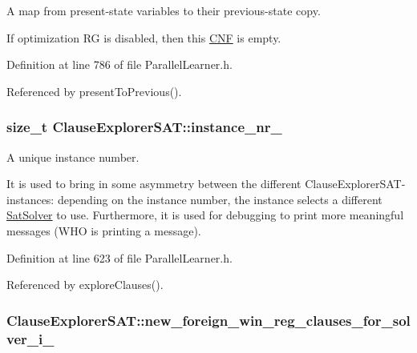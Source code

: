 A map from present-\/state variables to their previous-\/state copy. 

If optimization R\-G is disabled, then this \hyperlink{classCNF}{C\-N\-F} is empty. 

Definition at line 786 of file Parallel\-Learner.\-h.



Referenced by present\-To\-Previous().

\hypertarget{classClauseExplorerSAT_ab9ff4163b38a8ce70e07b78ea2e76cc2}{
\subsubsection[{instance\-\_\-nr\-\_\-}]{\setlength{\rightskip}{0pt plus 5cm}size\-\_\-t Clause\-Explorer\-S\-A\-T\-::instance\-\_\-nr\-\_\-\hspace{0.3cm}{\ttfamily [protected]}}}\label{classClauseExplorerSAT_ab9ff4163b38a8ce70e07b78ea2e76cc2}


A unique instance number. 

It is used to bring in some asymmetry between the different Clause\-Explorer\-S\-A\-T-\/instances\-: depending on the instance number, the instance selects a different \hyperlink{classSatSolver}{Sat\-Solver} to use. Furthermore, it is used for debugging to print more meaningful messages (W\-H\-O is printing a message). 

Definition at line 623 of file Parallel\-Learner.\-h.



Referenced by explore\-Clauses().

\hypertarget{classClauseExplorerSAT_a70c8edd590d75994ee354d591909cd35}{
\subsubsection[{new\-\_\-foreign\-\_\-win\-\_\-reg\-\_\-clauses\-\_\-for\-\_\-solver\-\_\-i\-\_\-}]{ Clause\-Explorer\-S\-A\-T\-::new\-\_\-foreign\-\_\-win\-\_\-reg\-\_\-clauses\-\_\-for\-\_\-solver\-\_\-i\-\_\-\hspace{0.3cm}{\ttfamily [protected]}}}\label{classClauseExplorerSAT_a70c8edd590d75994ee354d591909cd35}



